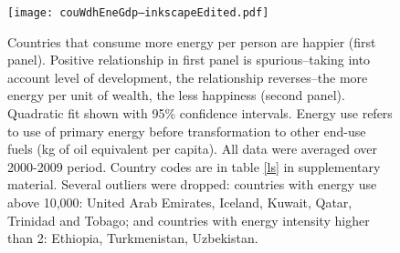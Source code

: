 \documentclass[10pt, letterpaper]{article}
\begin{document}
\begin{spacing}{1.5}
\begin{figure}[H]
 \texttt{[image: couWdhEneGdp--inkscapeEdited.pdf]}\centering \caption{Countries  that consume more energy per person are happier (first panel). Positive relationship in first panel is spurious--taking into account level of development, the relationship reverses--the more energy per unit of wealth, the less happiness (second panel).
Quadratic fit shown with 95\%  confidence intervals. Energy use
   refers to use of primary energy before transformation to other end-use
   fuels (kg of oil equivalent per capita). All data were averaged over 2000-2009 period.  %
 Country codes are in table \ref{ls} in supplementary material. 
 Several outliers were dropped: countries with energy use above 10,000: United Arab Emirates, Iceland, Kuwait, Qatar, Trinidad and Tobago; and countries with energy intensity higher than 2: Ethiopia, Turkmenistan, Uzbekistan.}\label{couWvsLsEnePerGdp2} 
\end{figure}


\end{spacing}
\end{document}
